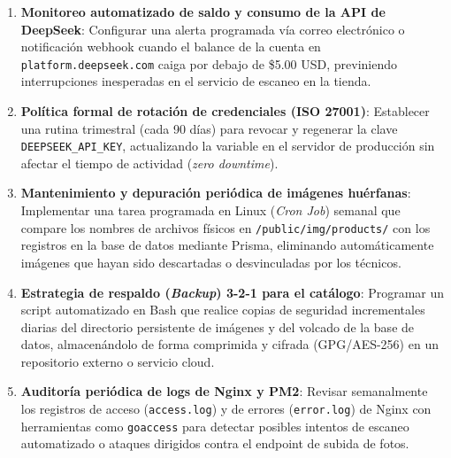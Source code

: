 \documentclass[11pt,a4paper]{article}
\begin{document}
\begin{enumerate}
    \item \textbf{Monitoreo automatizado de saldo y consumo de la API de DeepSeek}:
    Configurar una alerta programada vía correo electrónico o notificación webhook cuando el balance de la cuenta en \texttt{platform.deepseek.com} caiga por debajo de \$5.00 USD, previniendo interrupciones inesperadas en el servicio de escaneo en la tienda.

    \item \textbf{Política formal de rotación de credenciales (ISO 27001)}:
    Establecer una rutina trimestral (cada 90 días) para revocar y regenerar la clave \texttt{DEEPSEEK\_API\_KEY}, actualizando la variable en el servidor de producción sin afectar el tiempo de actividad (\textit{zero downtime}).

    \item \textbf{Mantenimiento y depuración periódica de imágenes huérfanas}:
    Implementar una tarea programada en Linux (\textit{Cron Job}) semanal que compare los nombres de archivos físicos en \texttt{/public/img/products/} con los registros en la base de datos mediante Prisma, eliminando automáticamente imágenes que hayan sido descartadas o desvinculadas por los técnicos.

    \item \textbf{Estrategia de respaldo (\textit{Backup}) 3-2-1 para el catálogo}:
    Programar un script automatizado en Bash que realice copias de seguridad incrementales diarias del directorio persistente de imágenes y del volcado de la base de datos, almacenándolo de forma comprimida y cifrada (GPG/AES-256) en un repositorio externo o servicio cloud.

    \item \textbf{Auditoría periódica de logs de Nginx y PM2}:
    Revisar semanalmente los registros de acceso (\texttt{access.log}) y de errores (\texttt{error.log}) de Nginx con herramientas como \texttt{goaccess} para detectar posibles intentos de escaneo automatizado o ataques dirigidos contra el endpoint de subida de fotos.
\end{enumerate}

\vspace{1cm}
\end{document}
